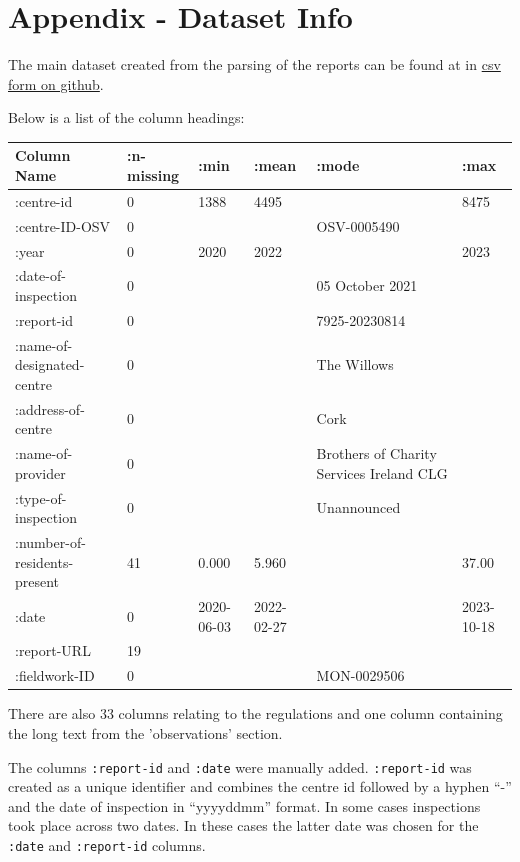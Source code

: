 \documentclass[a4paper,11pt,twoside]{article}
\begin{document}
\clearpage
\appendix
\section{Appendix - Dataset Info}
\label{sec:org5818e7c}

The main dataset created from the parsing of the reports can be found at in \href{https://github.com/loopdreams/inspection-reports-hiqa/blob/main/resources/datasets/created/pdf\_data\_full.csv}{csv form on github}.

Below is a list of the column headings:

\begin{center}
\begin{tabularx}{\textwidth}{XXXXXX}
\hline
Column Name & :n-missing & :min & :mean & :mode & :max\\[0pt]
\hline
\hline
:centre-id & 0 & 1388 & 4495 &  & 8475\\[0pt]
\hline
:centre-ID-OSV & 0 &  &  & OSV-0005490 & \\[0pt]
\hline
:year & 0 & 2020 & 2022 &  & 2023\\[0pt]
\hline
:date-of-inspection & 0 &  &  & 05 October 2021 & \\[0pt]
\hline
:report-id & 0 &  &  & 7925-20230814 & \\[0pt]
\hline
:name-of-designated-centre & 0 &  &  & The Willows & \\[0pt]
\hline
:address-of-centre & 0 &  &  & Cork & \\[0pt]
\hline
:name-of-provider & 0 &  &  & Brothers of Charity Services Ireland CLG & \\[0pt]
\hline
:type-of-inspection & 0 &  &  & Unannounced & \\[0pt]
\hline
:number-of-residents-present & 41 & 0.000 & 5.960 &  & 37.00\\[0pt]
\hline
:date & 0 & 2020-06-03 & 2022-02-27 &  & 2023-10-18\\[0pt]
\hline
:report-URL & 19 &  &  &  & \\[0pt]
\hline
:fieldwork-ID & 0 &  &  & MON-0029506 & \\[0pt]
\hline
\end{tabularx}
\end{center}


There are also 33 columns relating to the regulations and one column containing the long text from the 'observations' section.

The columns \texttt{:report-id} and \texttt{:date} were manually added. \texttt{:report-id} was created as a unique identifier and combines the centre id followed by a hyphen ``-'' and the date of inspection in ``yyyyddmm'' format. In some cases inspections took place across two dates. In these cases the latter date was chosen for the \texttt{:date} and \texttt{:report-id} columns.
\end{document}
